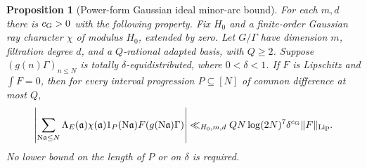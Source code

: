 \documentclass[11pt]{article}
\newtheorem{proposition}[theorem]{Proposition}
\theoremstyle{definition}
\theoremstyle{remark}
\begin{document}
\begin{proposition}[Power-form Gaussian ideal minor-arc bound]
\label{gi-minor-arc}
For each $m,d$ there is $c_{\rm G}>0$ with the following property.
Fix $H_0$ and a finite-order Gaussian ray character $\chi$ of modulus
$H_0$, extended by zero.  Let $G/\Gamma$ have dimension $m$, filtration
degree $d$, and a $Q$-rational adapted basis, with $Q\geq2$.  Suppose
$(g(n)\Gamma)_{n\leq N}$ is totally $\delta$-equidistributed, where
$0<\delta<1$.  If $F$ is Lipschitz and $\int F=0$, then for every
interval progression $P\subseteq[N]$ of common difference at most $Q$,
\begin{equation}\label{gi-power-bound}
 \left|\sum_{\mathrm N\mathfrak a\leq N}\Lambda_E(\mathfrak a)
       \chi(\mathfrak a)1_P(\mathrm N\mathfrak a)
       F(g(\mathrm N\mathfrak a)\Gamma)\right|
 \ll_{H_0,m,d} QN\log(2N)^7\delta^{c_{\rm G}}\|F\|_{\mathrm{Lip}}.
\end{equation}
No lower bound on the length of $P$ or on $\delta$ is required.
\end{proposition}
\end{document}
